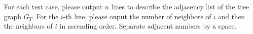 For each test case, please output $n$ lines to describe the adjacency list
of the tree graph $G_T$. 
For the $i$-th line, please ouput the number of neighbors of $i$ and 
then the neighbors of $i$ in ascending order.  
Separate adjacent numbers by a space.
